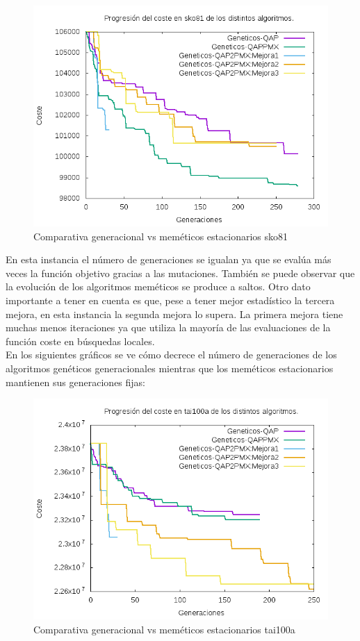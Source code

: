 \begin{figure}[H]
\centering
\includegraphics[width=0.7\linewidth]{graficos/comparativaGeneracionalsko81}
\caption{Comparativa generacional vs meméticos estacionarios sko81}
\label{fig:comparativaGeneracionalsko81}
\end{figure}

En esta instancia el número de generaciones se igualan ya que se evalúa más veces la función objetivo gracias a las mutaciones. También se puede observar que la evolución de los algoritmos meméticos se produce a saltos. Otro dato importante a tener en cuenta es que, pese a tener mejor estadístico la tercera mejora,  en esta instancia la segunda mejora lo supera. La primera mejora tiene muchas menos iteraciones ya que utiliza la mayoría de las evaluaciones de la función coste en búsquedas locales.\\

En los siguientes gráficos se ve cómo decrece el número de generaciones de los algoritmos genéticos generacionales mientras que los meméticos estacionarios mantienen sus generaciones fijas:\\

\begin{figure}[H]
	\centering
	\includegraphics[width=0.7\linewidth]{graficos/comparativaGeneracionaltai100a}
	\caption{Comparativa generacional vs meméticos estacionarios tai100a}
	\label{fig:comparativaGeneracionaltai100a}
\end{figure}
 
